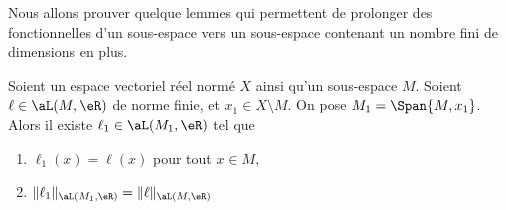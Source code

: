 Nous allons prouver quelque lemmes qui permettent de prolonger des fonctionnelles d'un sous-espace vers un sous-espace contenant un nombre fini de dimensions en plus.

\begin{lemma}     \label{LEMooHWSJooGVmIPV}
    Soient un espace vectoriel réel normé \( X\) ainsi qu'un sous-espace \( M\). Soient \( \ell\in\aL(M,\eR)\) de norme finie, et \( x_1\in X\setminus M\). On pose \( M_1=\Span\{ M, x_1 \}\). Alors il existe \( \ell_1\in\aL(M_1,\eR)\) tel que
    \begin{enumerate}
        \item
            \( \ell_1(x)=\ell(x)\) pour tout \( x\in M\),
        \item
            \( \| \ell_1 \|_{\aL(M_1,\eR)}=\| \ell \|_{\aL(M,\eR)}\)
    \end{enumerate}
\end{lemma}

